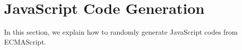 \section{JavaScript Code Generation}\label{sec:generation}

In this section, we explain how to randomly generate JavaScript codes
from ECMAScript.
